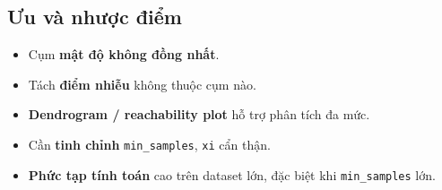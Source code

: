 
\subsection{Ưu và nhược điểm}

\begin{tinhchat}[title={Ưu điểm}]
\begin{itemize}
  \item Cụm \textbf{mật độ không đồng nhất}.
  \item Tách \textbf{điểm nhiễu} không thuộc cụm nào.
  \item \textbf{Dendrogram / reachability plot} hỗ trợ phân tích đa mức.
\end{itemize}
\end{tinhchat}

\begin{luuy}[title={Nhược điểm}]
\begin{itemize}
  \item Cần \textbf{tinh chỉnh} \texttt{min\_samples}, \texttt{xi} cẩn thận.
  \item \textbf{Phức tạp tính toán} cao trên dataset lớn, đặc biệt khi \texttt{min\_samples} lớn.
\end{itemize}
\end{luuy}
